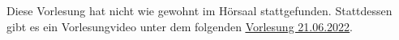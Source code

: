 Diese Vorlesung hat nicht wie gewohnt im Hörsaal stattgefunden. 
Stattdessen gibt es ein Vorlesungvideo unter dem folgenden 
\href{https://ls2-web.cs.tu-dortmund.de/~mamicoja/dap2/videos/lec_flow.mp4}{\underline{Vorlesung 21.06.2022}}.